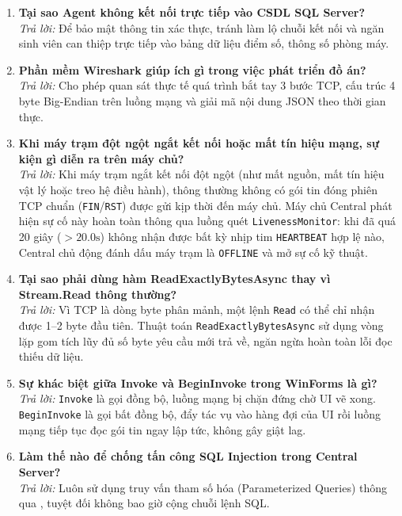\documentclass[12pt,a4paper]{article}
\begin{document}
\begin{enumerate}[leftmargin=*, label=\textbf{Câu \arabic*:}]
    \textit{Trả lời:} Sử dụng lệnh \texttt{Test-NetConnection -ComputerName 127.0.0.1 -Port 5000}.
  \item \textbf{Tại sao Agent không kết nối trực tiếp vào CSDL SQL Server?} \\
    \textit{Trả lời:} Để bảo mật thông tin xác thực, tránh làm lộ chuỗi kết nối và ngăn sinh viên can thiệp trực tiếp vào bảng dữ liệu điểm số, thông số phòng máy.
  \item \textbf{Phần mềm Wireshark giúp ích gì trong việc phát triển đồ án?} \\
    \textit{Trả lời:} Cho phép quan sát thực tế quá trình bắt tay 3 bước TCP, cấu trúc 4 byte Big-Endian trên luồng mạng và giải mã nội dung JSON theo thời gian thực.
  \item \textbf{Khi máy trạm đột ngột ngắt kết nối hoặc mất tín hiệu mạng, sự kiện gì diễn ra trên máy chủ?} \\
    \textit{Trả lời:} Khi máy trạm ngắt kết nối đột ngột (như mất nguồn, mất tín hiệu vật lý hoặc treo hệ điều hành), thông thường không có gói tin đóng phiên TCP chuẩn (\texttt{FIN}/\texttt{RST}) được gửi kịp thời đến máy chủ. Máy chủ Central phát hiện sự cố này hoàn toàn thông qua luồng quét \texttt{LivenessMonitor}: khi đã quá 20 giây ($> 20.0\text{s}$) không nhận được bất kỳ nhịp tim \texttt{HEARTBEAT} hợp lệ nào, Central chủ động đánh dấu máy trạm là \texttt{OFFLINE} và mở sự cố kỹ thuật.
  \item \textbf{Tại sao phải dùng hàm ReadExactlyBytesAsync thay vì Stream.Read thông thường?} \\
    \textit{Trả lời:} Vì TCP là dòng byte phân mảnh, một lệnh \texttt{Read} có thể chỉ nhận được 1--2 byte đầu tiên. Thuật toán \texttt{ReadExactlyBytesAsync} sử dụng vòng lặp gom tích lũy đủ số byte yêu cầu mới trả về, ngăn ngừa hoàn toàn lỗi đọc thiếu dữ liệu.
  \item \textbf{Sự khác biệt giữa Invoke và BeginInvoke trong WinForms là gì?} \\
    \textit{Trả lời:} \texttt{Invoke} là gọi đồng bộ, luồng mạng bị chặn đứng chờ UI vẽ xong. \texttt{BeginInvoke} là gọi bất đồng bộ, đẩy tác vụ vào hàng đợi của UI rồi luồng mạng tiếp tục đọc gói tin ngay lập tức, không gây giật lag.
  \item \textbf{Làm thế nào để chống tấn công SQL Injection trong Central Server?} \\
    \textit{Trả lời:} Luôn sử dụng truy vấn tham số hóa (Parameterized Queries) thông qua , tuyệt đối không bao giờ cộng chuỗi lệnh SQL.

\end{enumerate}
\end{document}
